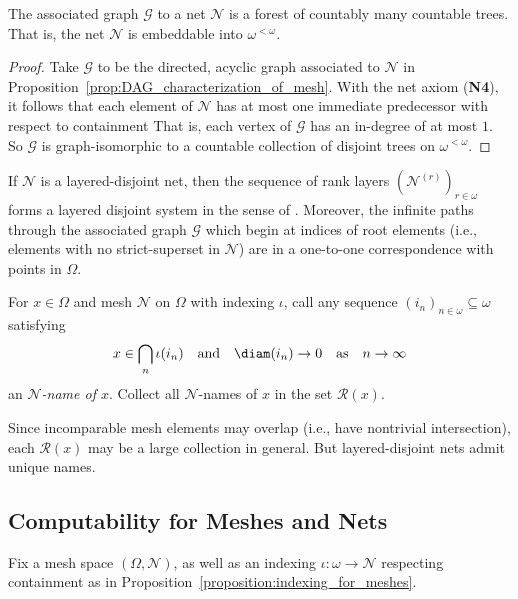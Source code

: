 \begin{proposition}
    The associated graph $\mathcal{G}$ to a net $\mathcal{N}$ is a forest of countably many countable trees. That is, the net $\mathcal{N}$ is embeddable into $\omega^{<\omega}$.
    \label{prop:tree_characterization_of_net}
\end{proposition}
\begin{proof}
    Take $\mathcal{G}$ to be the directed, acyclic graph associated to $\mathcal{N}$ in Proposition~\ref{prop:DAG_characterization_of_mesh}. With the net axiom (\textbf{N4}), it follows that each element of $\mathcal{N}$ has at most one immediate predecessor with respect to containment That is, each vertex of $\mathcal{G}$ has an in-degree of at most $1$. So $\mathcal{G}$ is graph-isomorphic to a countable collection of disjoint trees on $\omega^{<\omega}$. 
\end{proof}

If $\mathcal{N}$ is a layered-disjoint net, then the sequence of rank layers $(\mathcal{N}^{(r)})_{r \in \omega}$ forms a layered disjoint system in the sense of \cite{CL14}. Moreover, the infinite paths through the associated graph $\mathcal{G}$ which begin at indices of root elements (i.e., elements with no strict-superset in $\mathcal{N}$) are in a one-to-one correspondence with points in $\Omega$.

\begin{definition}
    For $x \in \Omega$ and mesh $\mathcal{N}$ on $\Omega$ with indexing $\iota$, call any sequence $(i_n)_{n \in \omega} \subseteq \omega$ satisfying 
    \begin{align*}
        x \in \bigcap_{n} \iota(i_n) \quad \text{and} \quad \diam(i_n) \to 0 \quad \text{as} \quad n \to \infty
    \end{align*}
    an \textit{$\mathcal{N}$-name of $x$}. Collect all $\mathcal{N}$-names of $x$ in the set $\mathcal{R}(x)$.
\end{definition}

Since incomparable mesh elements may overlap (i.e., have nontrivial intersection), each $\mathcal{R}(x)$ may be a large collection in general. But layered-disjoint nets admit unique names. 

\subsection{Computability for Meshes and Nets}

Fix a mesh space $(\Omega, \mathcal{N})$, as well as an indexing $\iota: \omega \to \mathcal{N}$ respecting containment as in Proposition~\ref{proposition:indexing_for_meshes}.

